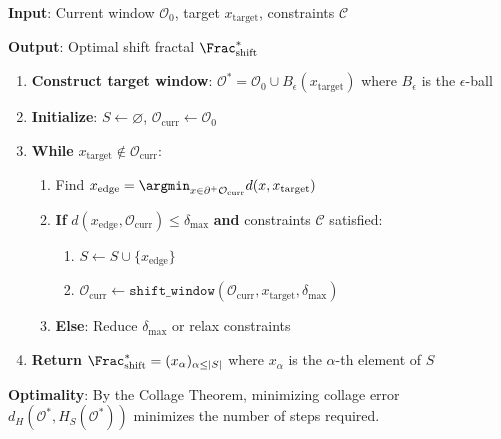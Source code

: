\begin{algorithm}
\label{alg:shift-design}
\textbf{Input}: Current window $\mathcal{O}_0$, target $x_{\mathrm{target}}$,
constraints $\mathcal{C}$

\textbf{Output}: Optimal shift fractal $\Frac^*_{\mathrm{shift}}$

\begin{enumerate}
    \item \textbf{Construct target window}:
          $\mathcal{O}^* = \mathcal{O}_0 \cup B_\epsilon(x_{\mathrm{target}})$
          where $B_\epsilon$ is the $\epsilon$-ball
    \item \textbf{Initialize}: $S \gets \varnothing$, $\mathcal{O}_{\mathrm{curr}}
          \gets \mathcal{O}_0$
    \item \textbf{While} $x_{\mathrm{target}} \notin \mathcal{O}_{\mathrm{curr}}$:
        \begin{enumerate}
            \item Find $x_{\mathrm{edge}} = \argmin_{x \in \partial^+\mathcal{O}_{\mathrm{curr}}}
                  d(x, x_{\mathrm{target}})$
            \item \textbf{If} $d(x_{\mathrm{edge}}, \mathcal{O}_{\mathrm{curr}}) \leq \delta_{\max}$
                  \textbf{and} constraints $\mathcal{C}$ satisfied:
                \begin{enumerate}
                    \item $S \gets S \cup \{x_{\mathrm{edge}}\}$
                    \item $\mathcal{O}_{\mathrm{curr}} \gets \mathtt{shift\_window}
                          (\mathcal{O}_{\mathrm{curr}}, x_{\mathrm{target}}, \delta_{\max})$
                \end{enumerate}
            \item \textbf{Else}: Reduce $\delta_{\max}$ or relax constraints
        \end{enumerate}
    \item \textbf{Return} $\Frac^*_{\mathrm{shift}} = (x_\alpha)_{\alpha \leq |S|}$
          where $x_\alpha$ is the $\alpha$-th element of $S$
\end{enumerate}

\textbf{Optimality}: By the Collage Theorem, minimizing collage error
$d_H(\mathcal{O}^*, H_S(\mathcal{O}^*))$ minimizes the number of steps required.
\end{algorithm}

